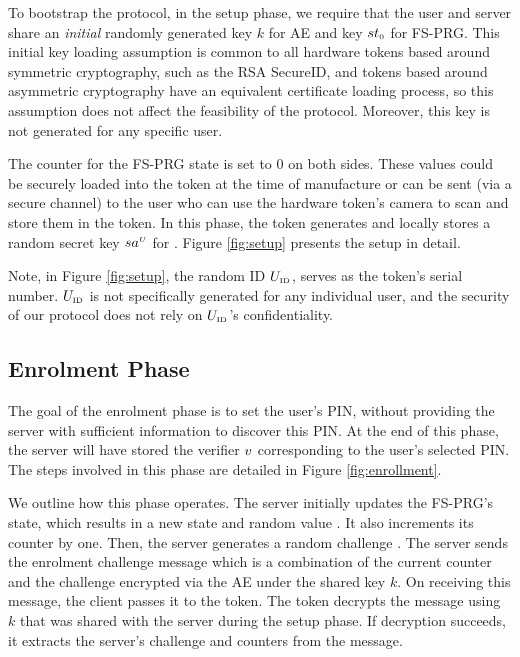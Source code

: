 To bootstrap the protocol, in the setup phase, we require that the user
and server share an \emph{initial} randomly generated key $k$ for AE and key ${st}_{\scriptscriptstyle 0}$ for  FS-PRG.
This initial key loading assumption is common to all hardware tokens based around symmetric cryptography, such as the RSA SecureID, and tokens based around asymmetric cryptography have an equivalent certificate loading process, so this assumption does not affect the feasibility of the protocol. Moreover, this key is not generated for any specific user. 

The counter for the FS-PRG state is set to $0$ on both sides. 
These values could be securely loaded into the token at the time of
manufacture or can be sent (via a secure channel) to the user who can use the hardware token's camera to scan and store them in the token.
In this phase, the token generates and locally stores a random secret key ${sa}^{\scriptscriptstyle U}$ for \prf.  Figure \ref{fig:setup} presents the setup in detail. 




Note, in Figure \ref{fig:setup}, the random ID $U_{\scriptscriptstyle \mathrm{ID}}$, serves as the token's serial number. $U_{\scriptscriptstyle \mathrm{ID}}$ is not specifically generated for any individual user, and the security of our protocol does not rely on $U_{\scriptscriptstyle \mathrm{ID}}$'s confidentiality. 

\subsection{Enrolment Phase}
\label{sec:enrollment}

The goal of the enrolment phase is to set the user's PIN, without providing the  
 server with sufficient information to discover this PIN. 
% 
  At the end of this phase, the server will have stored the verifier ${v}$ corresponding to the user's selected PIN.
The steps involved in this phase are detailed in Figure \ref{fig:enrollment}.  







We outline how this phase operates.  The server initially updates the FS-PRG's state, which results in a new state and random value . It also increments its counter by one. Then, the server generates a random challenge \VS{\nonce}. The server sends the enrolment challenge message which is a combination of the current counter and the challenge encrypted via the AE under the shared key $k$.
%
 On receiving this message, the client passes it to the token. The token decrypts the message using $k$ that was shared with the server during the setup phase.  If decryption succeeds, it extracts the server's challenge and counters from the message.
 
